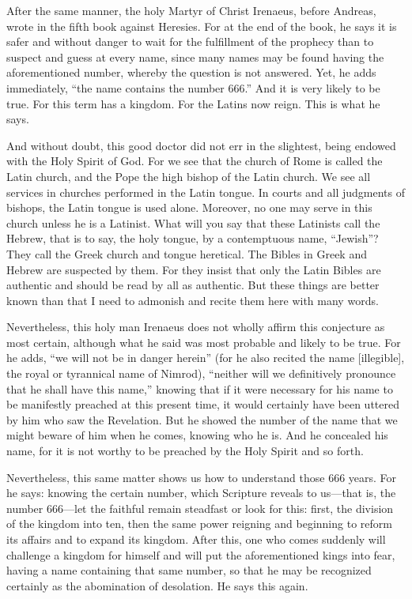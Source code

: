 After the same manner, the holy Martyr of Christ Irenaeus, before Andreas, wrote in the fifth book against Heresies. For at the end of the book, he says it is safer and without danger to wait for the fulfillment of the prophecy than to suspect and guess at every name, since many names may be found having the aforementioned number, whereby the question is not answered. Yet, he adds immediately, “the name contains the number 666.” And it is very likely to be true. For this term has a kingdom. For the Latins now reign. This is what he says.

And without doubt, this good doctor did not err in the slightest, being endowed with the Holy Spirit of God. For we see that the church of Rome is called the Latin church, and the Pope the high bishop of the Latin church. We see all services in churches performed in the Latin tongue. In courts and all judgments of bishops, the Latin tongue is used alone. Moreover, no one may serve in this church unless he is a Latinist. What will you say that these Latinists call the Hebrew, that is to say, the holy tongue, by a contemptuous name, “Jewish”? They call the Greek church and tongue heretical. The Bibles in Greek and Hebrew are suspected by them. For they insist that only the Latin Bibles are authentic and should be read by all as authentic. But these things are better known than that I need to admonish and recite them here with many words.

Nevertheless, this holy man Irenaeus does not wholly affirm this conjecture as most certain, although what he said was most probable and likely to be true. For he adds, “we will not be in danger herein” (for he also recited the name [illegible], the royal or tyrannical name of Nimrod), “neither will we definitively pronounce that he shall have this name,” knowing that if it were necessary for his name to be manifestly preached at this present time, it would certainly have been uttered by him who saw the Revelation. But he showed the number of the name that we might beware of him when he comes, knowing who he is. And he concealed his name, for it is not worthy to be preached by the Holy Spirit and so forth.

Nevertheless, this same matter shows us how to understand those 666 years. For he says: knowing the certain number, which Scripture reveals to us—that is, the number 666—let the faithful remain steadfast or look for this: first, the division of the kingdom into ten, then the same power reigning and beginning to reform its affairs and to expand its kingdom. After this, one who comes suddenly will challenge a kingdom for himself and will put the aforementioned kings into fear, having a name containing that same number, so that he may be recognized certainly as the abomination of desolation. He says this again.

